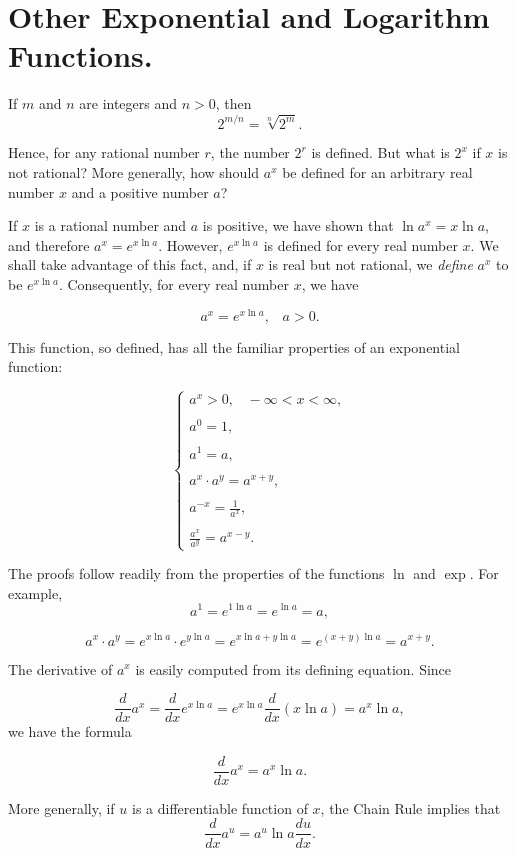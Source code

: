 \section{Other Exponential and Logarithm Functions.} \label{sec 5.4} 
If $m$ and $n$ are integers and $n > 0$, then
$$
2^{m/n} = \sqrt[n]{2^{m}}.
$$

\noindent Hence, for any rational number $r$, the number $2^r$ is defined. But what is $2^x$ if $x$ is not rational? More generally, how should $a^x$ be defined for an arbitrary real number $x$ and a positive number $a$?

If $x$ is a rational number and $a$ is positive, we have shown that $\ln a^{x} = x \ln a$, and therefore $a^{x} = e^{x \ln a}$. However, $e^{x \ln a}$ is defined for every real number $x$. We shall take advantage of this fact, and, if $x$ is real but not rational, we \textit{define} $a^x$ to be $e^{x \ln a}$.
Consequently,  for every real number $x$, we have

$$
a^{x} = e^{x \ln a}, \;\;\; a > 0.  
$$

This function, so defined, has all the familiar properties of an exponential function:

\begin{theorem}
\label{thm 5.4.1}
$$
\left \{
\begin{array}{l}
a^{x} > 0, \;\;\; -\infty < x < \infty,\\
\\
a^{0} = 1,\\
\\
a^{1} = a,\\
\\
a^{x} \cdot a^{y} = a^{x + y},\\
\\
a^{-x} = \frac{1}{a^x},\\
\\
\frac{a^x}{a^y} = a^{x-y}.
\end{array}
\right.
$$
\end{theorem}

The proofs follow readily from the properties of the functions $\ln$ and $\exp$. For example, 
$$
a^{1} = e^{1 \ln a} = e ^{\ln a} = a,
$$

$$
a^{x} \cdot a^{y} = e ^{x \ln a} \cdot e ^{y \ln a} = e^{x \ln a + y \ln a} 
= e^{(x + y)\ln a} = a^{x + y}.
$$

The derivative of $a^{x}$ is easily computed from its defining equation. Since 

$$
\frac{d}{dx}a^{x} = \frac{d}{dx} e^{x \ln a} = e^{x \ln a} \frac{d}{dx} (x \ln a) 
= a^{x} \ln a,
$$
we have the formula
\begin{theorem}
\label{thm 5.4.2}
$$
\frac{d}{dx} a^{x} = a^{x} \ln a.
$$
\end{theorem}
More generally, if $u$ is a differentiable function of $x$, the Chain Rule implies that 
\begin{equation}
\frac{d}{dx} a^{u} = a^{u} \ln a \frac{du}{dx}.
\label{eq5.4.1}
\end{equation}


